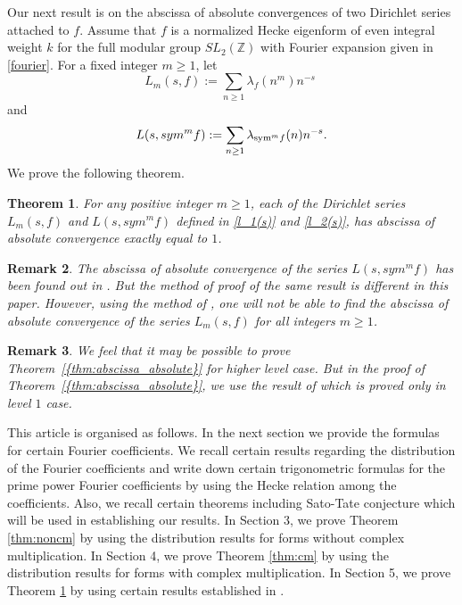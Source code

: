 \documentclass[12pt,a4paper,reqno]{amsart}
\newtheorem{theorem}{Theorem}[section]
\newtheorem{remark}[theorem]{Remark}
\begin{document}
Our next result is on the abscissa of absolute convergences of two Dirichlet series attached to $f$.
Assume that $f$ is a normalized Hecke eigenform of even integral weight $k$ for the full modular group  $SL_2(\mathbb{Z})$ with Fourier expansion given in \eqref{fourier}. For a fixed integer $m\ge 1$, let
\begin{equation}\label{l_1(s)}
L_m(s,f) := \sum_{n \geq 1}\lambda_f(n^m) n^{-s}\; 
 \end{equation}
and
\begin{equation}\label{l_2(s)}
L(s, sym^m f) := \sum_{n \geq 1} \lambda_{{\rm sym}^m f}(n) n^{-s}.
\end{equation}
We prove the following theorem.
\begin{theorem}\label{thm:abscissa_absolute}
For any positive integer $m\ge 1$, each of the Dirichlet series $L_m(s, f)$ and $L(s, sym^m f)$ defined in \eqref{l_1(s)} and \eqref{l_2(s)}, has abscissa of absolute convergence exactly equal to $1$. 
\end{theorem}
\begin{remark}
The abscissa of absolute convergence of the series $L(s, sym^m f)$ has been found out in \cite{KMP}. But the method of proof of the same result is different in this paper. However, using the method of \cite{KMP}, one will not be able to find the abscissa of absolute convergence of the series $L_m(s, f)$ for all integers $m\ge 1$.
\end{remark}
\begin{remark}
We feel that it may be possible to prove {Theorem~\ref{{thm:abscissa_absolute}}} for higher level case. But in the proof of {Theorem~\ref{{thm:abscissa_absolute}}}, we use the result of \cite{TW} which is proved only in level $1$ case.
\end{remark}
 
This article is organised as follows. In the next section we provide the formulas for certain Fourier coefficients. We recall certain results regarding the distribution of the Fourier coefficients and  
write down certain trigonometric formulas for the prime power Fourier coefficients by using the Hecke relation among the coefficients. Also, we recall certain theorems including Sato-Tate conjecture which will be used in establishing our results. In Section 3, we prove Theorem \ref{thm:noncm} by using the distribution results for forms without complex multiplication. In Section 4, we prove Theorem \ref{thm:cm} by using the distribution results for forms with complex multiplication. 
In Section 5, we prove Theorem \ref{thm:abscissa_absolute} by using certain results established in \cite{TW}.
\end{document}
